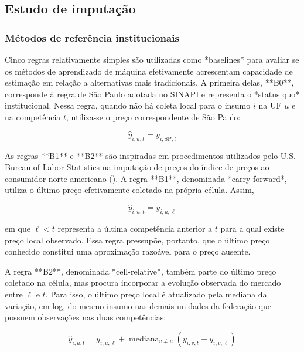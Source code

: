 \subsection{Estudo de imputação}

\subsubsection{Métodos de referência institucionais}

Cinco regras relativamente simples são utilizadas como *baselines* para avaliar se os 
métodos de aprendizado de máquina efetivamente acrescentam capacidade de estimação em 
relação a alternativas mais tradicionais. A primeira delas, **B0**, corresponde à regra 
de São Paulo adotada no SINAPI e representa o *status quo* institucional. Nessa regra, 
quando não há coleta local para o insumo \(i\) na UF \(u\) e na competência \(t\), 
utiliza-se o preço correspondente de São Paulo:

\begin{equation} \widehat{y}_{i,u,t} = y_{i,\mathrm{SP},t} \label{eq:regra-sp} \end{equation}


As regras **B1** e **B2** são inspiradas em procedimentos utilizados pelo U.S. 
Bureau of Labor Statistics na imputação de preços do índice de preços ao consumidor 
norte-americano (). A regra **B1**, 
denominada 
*carry-forward*, utiliza o último preço efetivamente coletado na própria célula. 
Assim,

\begin{equation} \widehat{y}_{i,u,t} = y_{i,u,\ell} \label{eq:regra-b1} \end{equation}

em que \(\ell<t\) representa a última competência anterior a \(t\) para a qual existe 
preço local observado. Essa regra pressupõe, portanto, que o último preço conhecido 
constitui uma aproximação razoável para o preço ausente.

A regra **B2**, denominada *cell-relative*, também parte do último preço coletado na 
célula, mas procura incorporar a evolução observada do mercado entre \(\ell\) e \(t\). 
Para isso, o último preço local é atualizado pela mediana da variação, em log, do mesmo 
insumo nas demais unidades da federação que possuem observações nas duas competências:

\begin{equation} \widehat{y}_{i,u,t} = y_{i,u,\ell} + \operatorname{mediana}_{v \neq u} \left( y_{i,v,t} - y_{i,v,\ell} \right) \label{eq:regra-b2} \end{equation}

